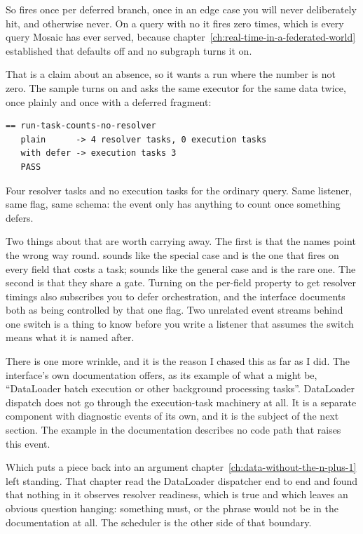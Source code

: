 So  fires once per deferred branch, once in an edge case you will
never deliberately hit, and otherwise never. On a query with no  it
fires zero times, which is every query Mosaic has ever served, because
chapter~\ref{ch:real-time-in-a-federated-world} established that
 defaults off and no subgraph turns it on.

%
That is a claim about an absence, so it wants a run where the number is not
zero. The sample turns  on and asks the same executor for the
same data twice, once plainly and once with a deferred fragment:

\begin{verbatim}
== run-task-counts-no-resolver
   plain      -> 4 resolver tasks, 0 execution tasks
   with defer -> execution tasks 3
   PASS
\end{verbatim}

Four resolver tasks and no execution tasks for the ordinary query. Same
listener, same flag, same schema: the event only has anything to count once
something defers.

%
Two things about that are worth carrying away. The first is that the names point
the wrong way round.  sounds like the special case and
is the one that fires on every field that costs a task;  sounds
like the general case and is the rare one. The second is that they share a
gate. Turning on the per-field property to get resolver timings also subscribes
you to defer orchestration, and the interface documents both as being controlled
by that one flag. Two unrelated event streams behind one switch is a thing to
know before you write a listener that assumes the switch means what it is named
after.

%
There is one more wrinkle, and it is the reason I chased this as far as I did.
The interface's own documentation offers, as its example of what a
 might be, \enquote{DataLoader batch execution or other background
processing tasks}. DataLoader dispatch does not go through the execution-task
machinery at all. It is a separate component with diagnostic events of its own,
and it is the subject of the next section. The example in the documentation
describes no code path that raises this event.

\medskip
Which puts a piece back into an argument
chapter~\ref{ch:data-without-the-n-plus-1} left standing. That chapter read the
DataLoader dispatcher end to end and found that nothing in it observes resolver
readiness, which is true and which leaves an obvious question hanging: something
must, or the phrase would not be in the documentation at all. The scheduler is
the other side of that boundary.

%
